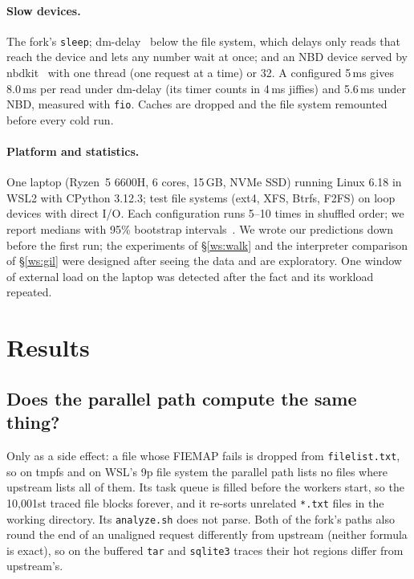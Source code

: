 \paragraph{Slow devices.} The fork's \texttt{sleep}; dm-delay~\cite{kerneldmdelay}
below the file system, which delays only reads that reach the device and lets any
number wait at once; and an NBD device served by nbdkit~\cite{nbdkit} with one thread
(one request at a time) or 32. A configured 5\,ms gives 8.0\,ms per read under dm-delay
(its timer counts in 4\,ms jiffies) and 5.6\,ms under NBD, measured with \texttt{fio}.
Caches are dropped and the file system remounted before every cold run.

\paragraph{Platform and statistics.} One laptop (Ryzen~5 6600H, 6 cores, 15\,GB, NVMe
SSD) running Linux 6.18 in WSL2 with CPython 3.12.3; test file systems (ext4, XFS,
Btrfs, F2FS) on loop devices with direct I/O. Each configuration runs 5--10 times in
shuffled order; we report medians with 95\% bootstrap intervals~\cite{hoefler2015scientific}.
We wrote our predictions down before the first run; the experiments of
\S\ref{ws:walk} and the interpreter comparison of \S\ref{ws:gil} were designed after
seeing the data and are exploratory. One window of external load on the laptop was
detected after the fact and its workload repeated.

\section{Results}

\subsection{Does the parallel path compute the same thing?}
\label{ws:correct}
Only as a side effect: a file whose FIEMAP fails is dropped from \texttt{filelist.txt},
so on tmpfs and on WSL's 9p file system the parallel path lists no files where upstream
lists all of them. Its task queue is filled before the workers start, so the 10{,}001st
traced file blocks forever, and it re-sorts unrelated \texttt{*.txt} files in the working
directory. Its \texttt{analyze.sh} does not parse. Both of the fork's paths also round the
end of an unaligned request differently from upstream (neither formula is exact), so on
the buffered \texttt{tar} and \texttt{sqlite3} traces their hot regions differ from
upstream's.

